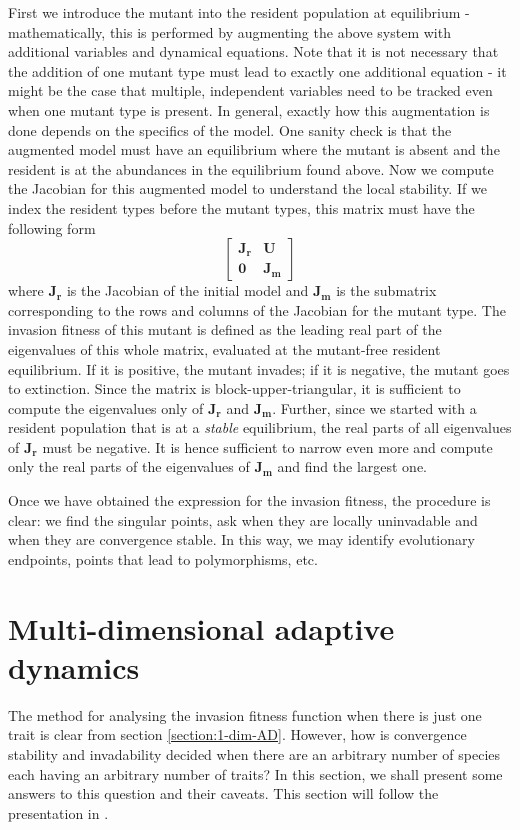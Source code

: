 First we introduce the mutant into the resident population at equilibrium - mathematically, this is performed by augmenting the above system with additional variables and dynamical equations. 
Note that it is not necessary that the addition of one mutant type must lead to exactly one additional equation - it might be the case that multiple, independent variables need to be tracked even when one mutant type is present.  
In general, exactly how this augmentation is done depends on the specifics of the model. 
One sanity check is that the augmented model must have an equilibrium where the mutant is absent and the resident is at the abundances in the equilibrium found above. 
Now we compute the Jacobian for this augmented model to understand the local stability. 
If we index the resident types before the mutant types, this matrix must have the following form 
\[
\begin{bmatrix}
	\mathbf{J_r} & \mathbf{U} \\
	\mathbf{0} & \mathbf{J_m}
\end{bmatrix}
\]
where $\mathbf{J_r}$ is the Jacobian of the initial model and $\mathbf{J_m}$ is the submatrix corresponding to the rows and columns of the Jacobian for the mutant type. 
The invasion fitness of this mutant is defined as the leading real part of the eigenvalues of this whole matrix, evaluated at the mutant-free resident equilibrium. 
If it is positive, the mutant invades; if it is negative, the mutant goes to extinction.
Since the matrix is block-upper-triangular, it is sufficient to compute the eigenvalues only of $\mathbf{J_r}$ and $\mathbf{J_m}$.
Further, since we started with a resident population that is at a \textit{stable} equilibrium, the real parts of all eigenvalues of $\mathbf{J_r}$ must be negative.
It is hence sufficient to narrow even more and compute only the real parts of the eigenvalues of $\mathbf{J_m}$ and find the largest one.   

Once we have obtained the expression for the invasion fitness, the procedure is clear: we find the singular points, ask when they are locally uninvadable and when they are convergence stable. 
In this way, we may identify evolutionary endpoints, points that lead to polymorphisms, etc.

\section{Multi-dimensional adaptive dynamics}
\label{section:multi-dim-AD}


The method for analysing the invasion fitness function when there is just one trait is clear from section \ref{section:1-dim-AD}. 
However, how is convergence stability and invadability decided when there are an arbitrary number of species each having an arbitrary number of traits? 
In this section, we shall present some answers to this question and their caveats.
This section will follow the presentation in \cite{leimar_multidimensional_2009}. 

